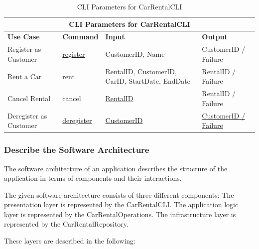 \begin{table}[h]
      \centering
      \caption{CLI Parameters for CarRentalCLI}
      \label{tab:cli_parameters_car_rental_cli}
      \begin{tabular}{|p{4cm}|p{2cm}|p{4cm}|p{5cm}|}
            \hline
            \multicolumn{4}{|c|}{\textbf{CLI Parameters for CarRentalCLI}} \\
            \hline
            \textbf{Use Case} & \textbf{Command} & \textbf{Input} & \textbf{Output} \\
            \hline
            Register as Customer & \underline{register} & CustomerID, Name & CustomerID / Failure \\
            \hline
            Rent a Car & rent & RentalID, CustomerID, CarID, StartDate, EndDate & RentalID / Failure \\
            \hline
            Cancel Rental & cancel & \underline{RentalID} & RentalID / Failure \\
            \hline
            Deregister as Customer & \underline{deregister} & \underline{CustomerID} & \underline{CustomerID / Failure} \\
            \hline
      \end{tabular}
\end{table}

\subsubsection*{Describe the Software Architecture}
The software architecture of an application describes the structure of the application in terms of components and their interactions.

The given software architecture consists of three different components:
The presentation layer is represented by the CarRentalCLI.
The application logic layer is represented by the CarRentalOperations.
The infrastructure layer is represented by the CarRentalRepository.

These layers are described in the following:
